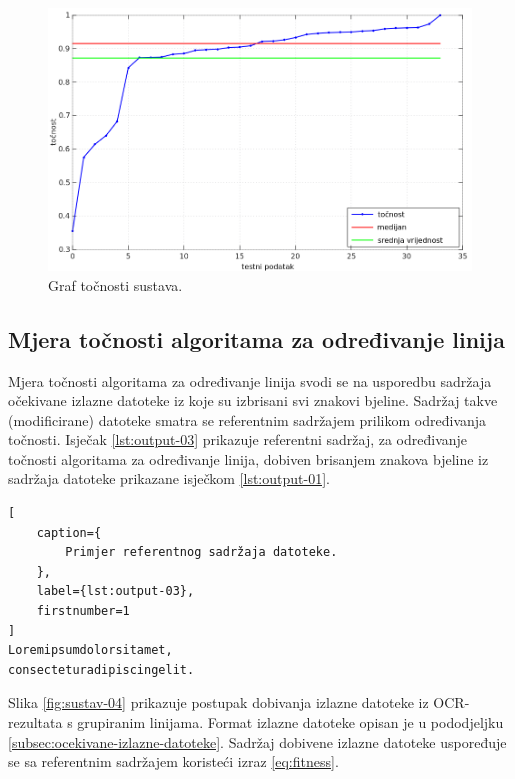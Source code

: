 \documentclass[times, utf8, zavrsni]{fer}
\begin{document}
\begin{figure}[htb]
    \centering
    \captionsetup{justification=centering,margin=2cm}
    \includegraphics[width=\textwidth]{images/result-example-01.png}
    \caption{Graf točnosti sustava.}
    \label{fig:result-example-01}
\end{figure}

\pagebreak




\subsection{Mjera točnosti algoritama za određivanje linija}
Mjera točnosti algoritama za određivanje linija svodi se na usporedbu
sadržaja očekivane izlazne datoteke iz koje su izbrisani svi znakovi bjeline.
Sadržaj takve (modificirane) datoteke smatra se referentnim sadržajem prilikom
određivanja točnosti. Isječak \ref{lst:output-03} prikazuje referentni sadržaj,
za određivanje točnosti algoritama za određivanje linija, dobiven brisanjem
znakova bjeline iz sadržaja datoteke prikazane isječkom \ref{lst:output-01}.

\begin{lstlisting}[
    caption={
        Primjer referentnog sadržaja datoteke.
    },
    label={lst:output-03},
    firstnumber=1
]
Loremipsumdolorsitamet,
consecteturadipiscingelit.
\end{lstlisting}

Slika \ref{fig:sustav-04} prikazuje postupak dobivanja izlazne datoteke iz
OCR-rezultata s grupiranim linijama. Format izlazne datoteke opisan je u
pododjeljku \ref{subsec:ocekivane-izlazne-datoteke}. Sadržaj dobivene izlazne
datoteke uspoređuje se sa referentnim sadržajem koristeći izraz
\ref{eq:fitness}.
\end{document}
